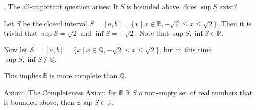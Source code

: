 \documentclass[8pt]{beamer}
\newcommand{\mbb}[1]{\mathbb{#1}}
\begin{document}
\begin{frame}{.}
    The all-important question arises: If $S$ is bounded above, does $\sup S$ exist?

    \begin{example}
        Let $S$ be the closed interval $S = [a,b] = \{x \mid x \in \mbb{R}, -\sqrt{2} \leq x \leq \sqrt{2}\}$.
        Then it is trivial that $\sup S = \sqrt{2}$ and $\inf S = -\sqrt{2}$.
        Note that $\sup S, \inf S \in \mbb{R}$.

        Now let $S^\prime = [a,b] = \{x \mid x \in \mbb{Q}, -\sqrt{2} \leq x \leq \sqrt{2}\}$.
        but in this time $\sup S, \inf S \notin \mbb{Q}$.

        This implies $\mbb{R}$ is more complete than $\mbb{Q}$.
    \end{example}


    \begin{block}{Axiom: The Completeness Axiom for $\mbb{R}$}
        If $S$ a non-empty set of real numbers that is bounded above, then $\exists \sup S \in \mbb{R}$.
    \end{block}

\end{frame}
\end{document}

